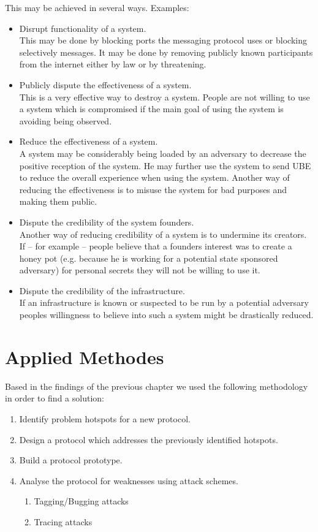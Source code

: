 This may be achieved in several ways. Examples:
\begin{itemize}
	\item Disrupt functionality of a system.\\ 
	This may be done by blocking ports the messaging protocol uses or blocking selectively messages. It may be done by removing publicly known participants from the internet either by law or by threatening.
	\item Publicly dispute the effectiveness of a system.\\
	This is a very effective way to destroy a system. People are not willing to use a system which is compromised if the main goal of using the system is avoiding being observed.
	\item Reduce the effectiveness of a system.\\
	A system may be considerably being loaded by an adversary to decrease the positive reception of the system. He may further use the system to send UBE to reduce the overall experience when using the system. Another way of reducing the effectiveness is to misuse the system for bad purposes and making them public.
	\item Dispute the credibility of the system founders.\\
	Another way of reducing credibility of a system is to undermine its creators. If -- for example -- people believe that a founders interest was to create a honey pot (e.g. because he is working for a potential state sponsored adversary) for personal secrets they will not be willing to use it.
	\item Dispute the credibility of the infrastructure.\\
	If an infrastructure is known or suspected to be run by a potential adversary peoples willingness to believe into such a system might be drastically reduced.
\end{itemize}

\chapter{Applied Methodes\label{sec:appliedMethods}}
Based in the findings of the previous chapter we used the following methodology in order to find a solution:
\begin{enumerate}
	\item Identify problem hotspots for a new protocol.
	\item Design a protocol which addresses the previously identified hotspots.
	\item Build a protocol prototype.
	\item Analyse the protocol for weaknesses using attack schemes.
	\begin{enumerate}
		\item Tagging/Bugging attacks
		\item Tracing attacks
	\end{enumerate}
\end{enumerate}

